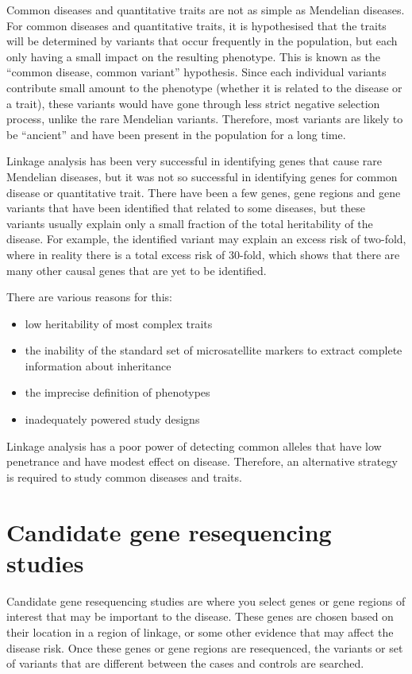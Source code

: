 Common diseases and quantitative traits are not as simple as Mendelian diseases.
For common diseases and quantitative traits, it is hypothesised that the traits will be determined by variants that occur frequently in the population, but each only having a small impact on the resulting phenotype.
This is known as the ``common disease, common  variant'' hypothesis.
Since each individual variants contribute small amount to the phenotype (whether it is related to the disease or a trait), these variants would have gone through less strict negative selection process, unlike the rare Mendelian variants.
Therefore, most variants are likely to be ``ancient'' and have been present in the population for a long time.

Linkage analysis has been very successful in identifying genes that cause rare Mendelian diseases, but it was not so successful in identifying genes for common disease or quantitative trait.
There have been a few genes, gene regions and gene variants that have been identified that related to some diseases, but these variants usually explain only a small fraction of the total \gls{heritability} of the disease.
For example, the identified variant may explain an excess risk of two-fold, where in reality there is a total excess risk of 30-fold, which shows that there are many other causal genes that are yet to be identified.

There are various reasons for this:
\begin{itemize}[noitemsep]
	\item low \gls{heritability} of most complex traits
	\item the inability of the standard set of microsatellite markers to extract complete information about inheritance
	\item the imprecise definition of phenotypes
	\item inadequately powered study designs
\end{itemize}
Linkage analysis has a poor power of detecting common alleles that have low penetrance and have modest effect on disease.
Therefore, an alternative strategy is required to study common diseases and traits.

\section{Candidate gene resequencing studies}
\label{sec:candidate_gene_resequencing_studies}

Candidate gene resequencing studies are where you select genes or gene regions of interest that may be important to the disease.
These genes are chosen based on their location in a region of linkage, or some other evidence that may affect the disease risk.
Once these genes or gene regions are resequenced, the variants or set of variants that are different between the cases and controls are searched.

